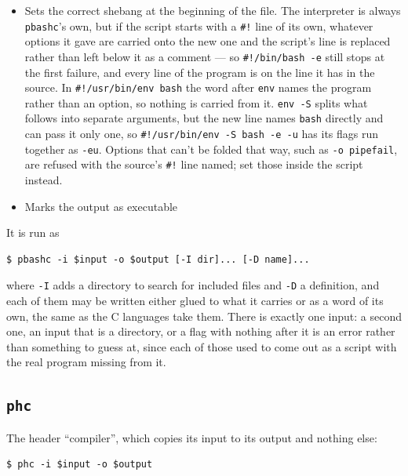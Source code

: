 \documentclass{article}
\begin{document}
\begin{itemize}
  A heredoc that no line ever ends has taken the rest of the file for
  its body.  If a directive went down with it \texttt{pbashc} says
  which one and stops, because that is a file which would otherwise
  have come out with an include silently missing from it; if the body
  was nothing but text then it was going to be treated as text either
  way, and nothing is said.
\item Sets the correct shebang at the beginning of the file.  The
  interpreter is always \texttt{pbashc}'s own, but if the script
  starts with a \texttt{\#!} line of its own, whatever options it
  gave are carried onto the new one and the script's line is
  replaced rather than left below it as a comment --- so
  \texttt{\#!/bin/bash -e} still stops at the first failure, and
  every line of the program is on the line it has in the source.  In
  \texttt{\#!/usr/bin/env bash} the word after \texttt{env} names
  the program rather than an option, so nothing is carried from it.
  \texttt{env -S} splits what follows into separate arguments, but
  the new line names \texttt{bash} directly and can pass it only one,
  so \texttt{\#!/usr/bin/env -S bash -e -u} has its flags run
  together as \texttt{-eu}.  Options that can't be folded that way,
  such as \texttt{-o pipefail}, are refused with the source's
  \texttt{\#!} line named; set those inside the script instead.
\item Marks the output as executable
\end{itemize}

It is run as
\begin{verbatim}
$ pbashc -i $input -o $output [-I dir]... [-D name]...
\end{verbatim}
where \texttt{-I} adds a directory to search for included files and
\texttt{-D} a definition, and each of them may be written either
glued to what it carries or as a word of its own, the same as the C
languages take them.  There is exactly one input: a second one, an
input that is a directory, or a flag with nothing after it is an
error rather than something to guess at, since each of those used to
come out as a script with the real program missing from it.

\subsection{\texttt{phc} \label{prog:phc}}

The header ``compiler'', which copies its input to its output and
nothing else:
\begin{verbatim}
$ phc -i $input -o $output
\end{verbatim}
\end{document}
